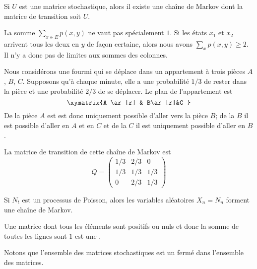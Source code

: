 \begin{lemma}
    Si \( U\) est une matrice stochastique, alors il existe une chaîne de Markov dont la matrice de transition soit \( U\).
\end{lemma}

\begin{remark}
    La somme \( \sum_{x\in E}p(x,y)\) ne vaut pas spécialement \( 1\). Si les états \( x_1\) et \( x_2\) arrivent tous les deux en \( y\) de façon certaine, alors nous avons \( \sum_xp(x,y)\geq 2\). Il n'y a donc pas de limites aux sommes des colonnes.
\end{remark}

\begin{example}
    Nous considérons une fourmi qui se déplace dans un appartement à trois pièces \( A\), \( B\), \( C\). Supposons qu'à chaque minute, elle a une probabilité \( 1/3\) de rester dans la pièce et une probabilité \( 2/3\) de se déplacer. Le plan de l'appartement est
    \begin{equation}
        \xymatrix{%
        A \ar[r]      &  B\ar[r]&C
           }
    \end{equation}
    De la pièce \( A\) est est donc uniquement possible d'aller vers la pièce \( B\); de la \( B\) il est possible d'aller en \( A\) et en \( C\) et de la \( C\) il est uniquement possible d'aller en \( B\).

    La matrice de transition de cette chaîne de Markov est 
    \begin{equation}
        Q=\begin{pmatrix}
            1/3    &   2/3    &   0    \\
            1/3    &   1/3    &   1/3    \\
            0    &   2/3    &   1/3
        \end{pmatrix}
    \end{equation}
\end{example}

\begin{example}
    Si \( N_t\) est un processus de Poisson, alors les variables aléatoires \( X_n=N_n\) forment une chaîne de Markov.
\end{example}

\begin{definition}
    Une matrice dont tous les éléments sont positifs ou nuls et donc la somme de toutes les lignes sont \( 1\) est une .
\end{definition}
Notons que l'ensemble des matrices stochastiques est un fermé dans l'ensemble des matrices.

